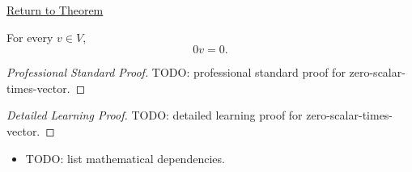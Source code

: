 \newpage
{}
\label{prf:zero-scalar-times-vector}

\begin{remark*}[Return]
\hyperref[thm:zero-scalar-times-vector]{Return to Theorem}
\end{remark*}

\begin{theorem*}[$0v=0$]
For every $v \in V$,
\[
0v=0.
\]
\end{theorem*}

\begin{proof}[Professional Standard Proof]
\LRAProofBodyStart
TODO: professional standard proof for zero-scalar-times-vector.
\end{proof}

\begin{proof}[Detailed Learning Proof]
\LRAProofBodyStart
TODO: detailed learning proof for zero-scalar-times-vector.
\end{proof}

\begin{remark*}
\end{remark*}

\begin{dependencies}
\begin{itemize}
  \item TODO: list mathematical dependencies.
\end{itemize}
\end{dependencies}

\clearpage
